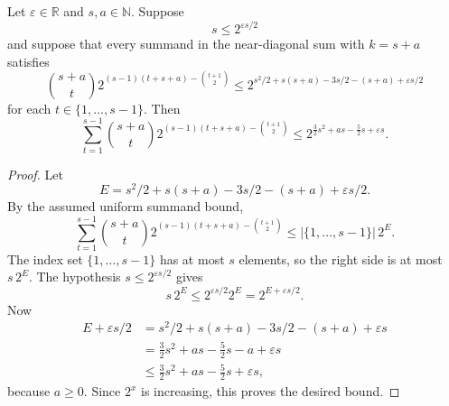 \begin{helper}
Let \(\varepsilon\in\mathbb R\) and \(s,a\in\mathbb N\). Suppose
\[
  s\le 2^{\varepsilon s/2}
\]
and suppose that every summand in the near-diagonal sum with \(k=s+a\) satisfies
\[
  \binom{s+a}{t}
    2^{(s-1)(t+s+a)-\binom{t+1}{2}}
  \le
  2^{s^2/2+s(s+a)-3s/2-(s+a)+\varepsilon s/2}
\]
for each \(t\in\{1,\ldots,s-1\}\). Then
\[
  \sum_{t=1}^{s-1}
    \binom{s+a}{t}
      2^{(s-1)(t+s+a)-\binom{t+1}{2}}
  \le
  2^{\frac32s^2+as-\frac52s+\varepsilon s}.
\]
\end{helper}
\begin{proof}
Let
\[
  E=s^2/2+s(s+a)-3s/2-(s+a)+\varepsilon s/2.
\]
By the assumed uniform summand bound,
\[
  \sum_{t=1}^{s-1}
    \binom{s+a}{t}
      2^{(s-1)(t+s+a)-\binom{t+1}{2}}
  \le
  |\{1,\ldots,s-1\}|\,2^E.
\]
The index set \(\{1,\ldots,s-1\}\) has at most \(s\) elements, so the right
side is at most \(s\,2^E\). The hypothesis \(s\le2^{\varepsilon s/2}\) gives
\[
  s\,2^E\le 2^{\varepsilon s/2}2^E=2^{E+\varepsilon s/2}.
\]
Now
\[
\begin{aligned}
  E+\varepsilon s/2
  &=s^2/2+s(s+a)-3s/2-(s+a)+\varepsilon s \\
  &=\frac32s^2+as-\frac52s-a+\varepsilon s \\
  &\le \frac32s^2+as-\frac52s+\varepsilon s,
\end{aligned}
\]
because \(a\ge0\). Since \(2^x\) is increasing, this proves the desired
bound.
\end{proof}
